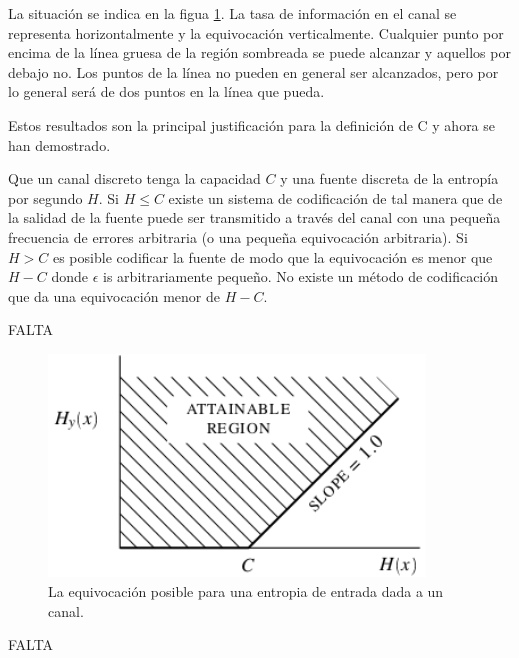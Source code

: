 La situaci\'{o}n se indica en la figua \ref{fig:9}. La tasa de
informaci\'{o}n en el canal se representa horizontalmente y la
equivocaci\'{o}n verticalmente. Cualquier punto por encima de la
l\'{i}nea gruesa de la regi\'{o}n sombreada se puede alcanzar y
aquellos por debajo no. Los puntos de la l\'{i}nea no pueden en
general ser alcanzados, pero por lo general ser\'{a} de dos puntos en
la l\'{i}nea que pueda.

Estos resultados son la principal justificaci\'{o}n para la
definici\'{o}n de C y ahora se han demostrado.

\begin{theorem}
\label{th:11}
Que un canal discreto tenga la capacidad $C$ y una fuente discreta de
la entrop\'{i}a por segundo $H$. Si $H \leq C$ existe un sistema de
codificaci\'{o}n de tal manera que de la salidad de la fuente puede
ser transmitido a trav\'{e}s del canal con una peque\~{n}a frecuencia
de errores arbitraria (o una peque\~{n}a equivocaci\'{o}n
arbitraria). Si $H > C$ es posible codificar la fuente de modo que la
equivocaci\'{o}n es menor que $H - C$ donde $\epsilon$ is
arbitrariamente peque\~{n}o. No existe un m\'{e}todo de
codificaci\'{o}n que da una equivocaci\'{o}n menor de $H - C$.
\end{theorem}

FALTA

\begin{figure}[!ht]
\centerline{\includegraphics[width=100mm]{Imagenes/SinComentarios/Pagina22-Figura9.png}}
\caption{La equivocaci\'{o}n posible para una entropia de entrada dada
  a un canal.}
\label{fig:9}
\end{figure}

FALTA

